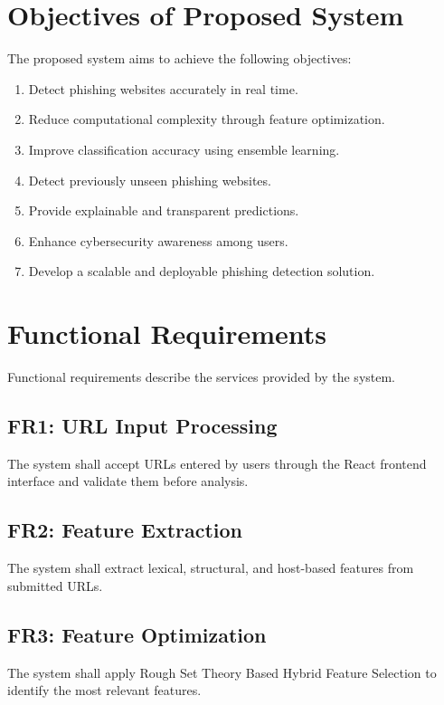 \documentclass[12pt]{report}
\begin{document}
\section{Objectives of Proposed System}

The proposed system aims to achieve the following objectives:

\begin{enumerate}
    \item Detect phishing websites accurately in real time.
    \item Reduce computational complexity through feature optimization.
    \item Improve classification accuracy using ensemble learning.
    \item Detect previously unseen phishing websites.
    \item Provide explainable and transparent predictions.
    \item Enhance cybersecurity awareness among users.
    \item Develop a scalable and deployable phishing detection solution.
\end{enumerate}

\section{Functional Requirements}

Functional requirements describe the services provided by the system.

\subsection{FR1: URL Input Processing}

The system shall accept URLs entered by users through the React frontend interface and validate them before analysis.

\subsection{FR2: Feature Extraction}

The system shall extract lexical, structural, and host-based features from submitted URLs.

\subsection{FR3: Feature Optimization}

The system shall apply Rough Set Theory Based Hybrid Feature Selection to identify the most relevant features.
\end{document}
